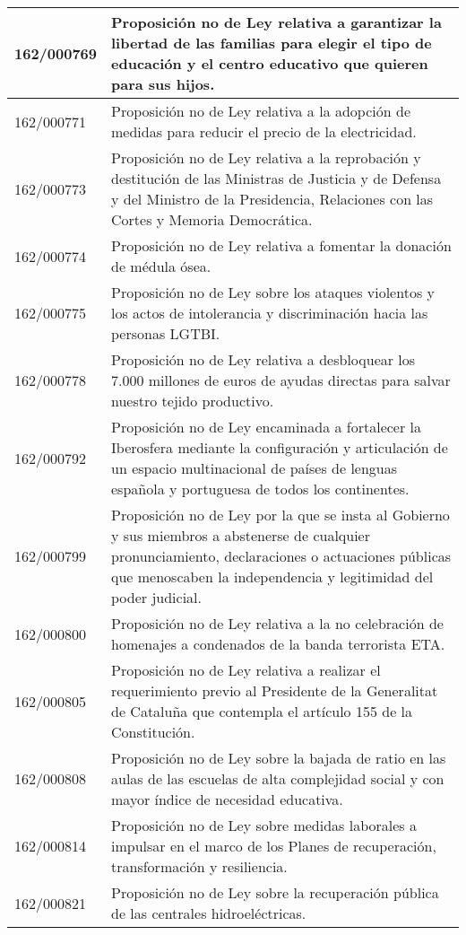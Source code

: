 {\begin{table}[H]
\begin{center}
\begin{tabularx}{\linewidth}{| l | X |}
\hline
162/000769 & Proposición no de Ley relativa a garantizar la libertad de las familias para elegir el tipo de educación y el centro educativo que quieren para sus hijos. \\
\hline
162/000771 & Proposición no de Ley relativa a la adopción de medidas para reducir el precio de la electricidad. \\
\hline
162/000773 & Proposición no de Ley relativa a la reprobación y destitución de las Ministras de Justicia y de Defensa y del Ministro de la Presidencia, Relaciones con las Cortes y Memoria Democrática. \\
\hline
162/000774 & Proposición no de Ley relativa a fomentar la donación de médula ósea. \\
\hline
162/000775 & Proposición no de Ley sobre los ataques violentos y los actos de intolerancia y discriminación hacia las personas LGTBI. \\
\hline
162/000778 & Proposición no de Ley relativa a desbloquear los 7.000 millones de euros de ayudas directas para salvar nuestro tejido productivo. \\
\hline
162/000792 & Proposición no de Ley encaminada a fortalecer la Iberosfera mediante la configuración y articulación de un espacio multinacional de países de lenguas española y portuguesa de todos los continentes. \\
\hline
162/000799 & Proposición no de Ley por la que se insta al Gobierno y sus miembros a abstenerse de cualquier pronunciamiento, declaraciones o actuaciones públicas que menoscaben la independencia y legitimidad del poder judicial. \\
\hline
162/000800 & Proposición no de Ley relativa a la no celebración de homenajes a condenados de la banda terrorista ETA. \\
\hline
162/000805 & Proposición no de Ley relativa a realizar el requerimiento previo al Presidente de la Generalitat de Cataluña que contempla el artículo 155 de la Constitución. \\
\hline
162/000808 & Proposición no de Ley sobre la bajada de ratio en las aulas de las escuelas de alta complejidad social y con mayor índice de necesidad educativa. \\
\hline
162/000814 & Proposición no de Ley sobre medidas laborales a impulsar en el marco de los Planes de recuperación, transformación y resiliencia. \\
\hline
162/000821 & Proposición no de Ley sobre la recuperación pública de las centrales hidroeléctricas. \\

\end{tabularx}
\end{center}
\end{table}}
